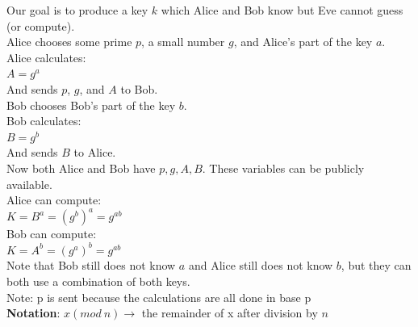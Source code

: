 \documentclass[9pt, letterpaper, oneside]{article}
\begin{document}
Our goal is to produce a key $k$ which Alice and Bob know but Eve cannot guess (or compute).\\
Alice chooses some prime $p$, a small number $g$, and Alice's part of the key $a$.\\
Alice calculates:\\
\qquad $A = g^a$\\
And sends $p$, $g$, and $A$ to Bob.\\
Bob chooses Bob's part of the key $b$.\\
Bob calculates:\\
\qquad $B = g^b$\\
And sends $B$ to Alice.\\
Now both Alice and Bob have $p, g, A, B$. These variables can be publicly available.\\
Alice can compute:\\
\qquad $K = B^a = (g^b)^a = g^{ab}$\\
Bob can compute:\\
\qquad $K = A^b = (g^a)^b = g^{ab}$\\

Note that Bob still does not know $a$ and Alice still does not know $b$, but they can both use a combination of both keys.\\
Note: p is sent because the calculations are all done in base p\\


\textbf{Notation}: $x (mod \ n) \to$ the remainder of x after division by $n$
\end{document}
